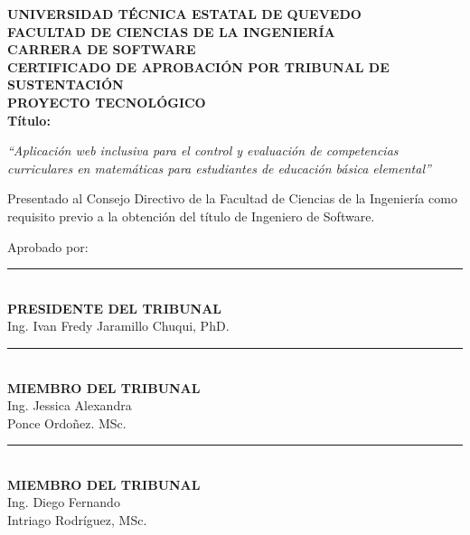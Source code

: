 \documentclass[12pt,a4paper,oneside]{report}
\begin{document}
\newpage

\begin{center}
    \vspace*{0.3cm}
    {\bfseries UNIVERSIDAD TÉCNICA ESTATAL DE QUEVEDO}\\[0.3cm]
    {\bfseries FACULTAD DE CIENCIAS DE LA INGENIERÍA}\\[0.3cm]
    {\bfseries CARRERA DE SOFTWARE}\\[1cm]

    {\bfseries CERTIFICADO DE APROBACIÓN POR TRIBUNAL DE SUSTENTACIÓN}\\[0.5cm]
    {\bfseries PROYECTO TECNOLÓGICO}\\[0.8cm]

    \textbf{Título:}\\[0.3cm]
    \begin{minipage}{0.85\textwidth}
        \centering
        \itshape
        ``Aplicación web inclusiva para el control y evaluación de competencias curriculares en matemáticas para estudiantes de educación básica elemental''
    \end{minipage}
\end{center}

\vspace{0.6cm}
\justifying
Presentado al Consejo Directivo de la Facultad de Ciencias de la Ingeniería como requisito previo a la obtención del título de Ingeniero de Software.

\vspace{0.4cm}
Aprobado por:

\vspace{1.5cm}
\begin{center}
    \rule{8cm}{0.4pt}\\[0.2cm]
    \textbf{PRESIDENTE DEL TRIBUNAL}\\
    Ing. Ivan Fredy Jaramillo Chuqui, PhD.
\end{center}

\vspace{1.2cm}
\begin{center}
    \begin{minipage}{0.45\textwidth}
        \centering
        \rule{6cm}{0.4pt}\\[0.2cm]
        \textbf{MIEMBRO DEL TRIBUNAL}\\
        Ing. Jessica Alexandra\\
        Ponce Ordoñez. MSc.
    \end{minipage}
    \hfill
    \begin{minipage}{0.45\textwidth}
        \centering
        \rule{6cm}{0.4pt}\\[0.2cm]
        \textbf{MIEMBRO DEL TRIBUNAL}\\
        Ing. Diego Fernando\\
        Intriago Rodríguez, MSc.
    \end{minipage}
\end{center}
\end{document}
